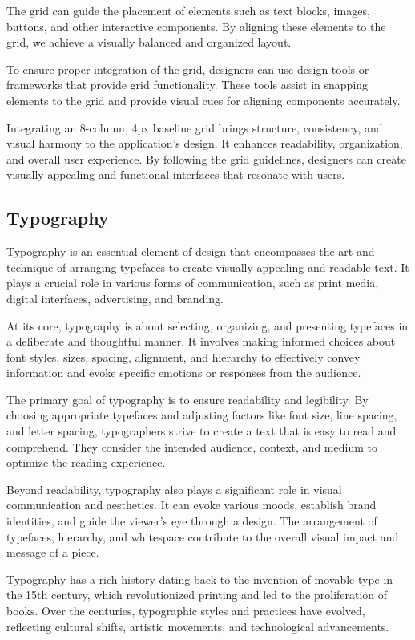 The grid can guide the placement of elements such as text blocks, images, buttons, and other interactive components. By aligning these elements to the grid, we achieve a visually balanced and organized layout.

To ensure proper integration of the grid, designers can use design tools or frameworks that provide grid functionality. These tools assist in snapping elements to the grid and provide visual cues for aligning components accurately.

Integrating an 8-column, 4px baseline grid brings structure, consistency, and visual harmony to the application's design. It enhances readability, organization, and overall user experience. By following the grid guidelines, designers can create visually appealing and functional interfaces that resonate with users.




\subsection{Typography}
Typography is an essential element of design that encompasses the art and technique of arranging typefaces to create visually appealing and readable text. It plays a crucial role in various forms of communication, such as print media, digital interfaces, advertising, and branding.

At its core, typography is about selecting, organizing, and presenting typefaces in a deliberate and thoughtful manner. It involves making informed choices about font styles, sizes, spacing, alignment, and hierarchy to effectively convey information and evoke specific emotions or responses from the audience.

The primary goal of typography is to ensure readability and legibility. By choosing appropriate typefaces and adjusting factors like font size, line spacing, and letter spacing, typographers strive to create a text that is easy to read and comprehend. They consider the intended audience, context, and medium to optimize the reading experience.

Beyond readability, typography also plays a significant role in visual communication and aesthetics. It can evoke various moods, establish brand identities, and guide the viewer’s eye through a design. The arrangement of typefaces, hierarchy, and whitespace contribute to the overall visual impact and message of a piece.

Typography has a rich history dating back to the invention of movable type in the 15th century, which revolutionized printing and led to the proliferation of books. Over the centuries, typographic styles and practices have evolved, reflecting cultural shifts, artistic movements, and technological advancements.

